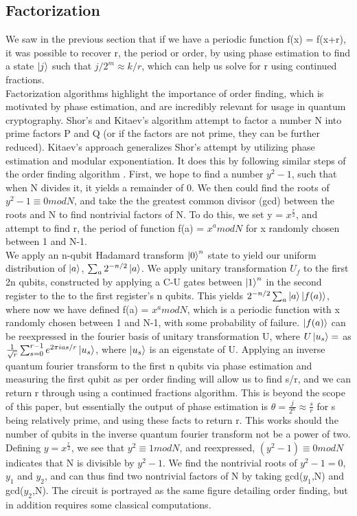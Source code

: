 \documentclass[11pt]{journal}
\begin{document}
\subsection{Factorization}
We saw in the previous section that if we have a periodic function f(x) = f(x+r), it was possible to recover r, the period or order, by using phase estimation to find a state $\ket{j}$ such that $j/2^m \approx k/r$, which can help us solve for r using continued fractions. 
\\\indent Factorization algorithms highlight the importance of order finding, which is motivated by phase estimation, and are incredibly relevant for usage in quantum cryptography. Shor’s and Kitaev's algorithm attempt to factor a number N into prime factors P and Q (or if the factors are not prime, they can be further reduced). Kitaev's approach generalizes Shor's attempt by utilizing phase estimation and modular exponentiation. It does this by following similar steps of the order finding algorithm \cite{factor}. First, we hope to find a number $y^2 - 1$, such that when N divides it, it yields a remainder of 0. We then could find the roots of $y^2 - 1\equiv 0 mod N$, and take the the greatest common divisor (gcd) between the roots and N to find nontrivial factors of N. To do this, we set y = $x^\frac{r}{2}$, and attempt to find r, the period of function f(a) = $x^a mod N$ for x randomly chosen between 1 and N-1.
\\\indent We apply an n-qubit Hadamard transform $\ket{0}^n$ state to yield our uniform distribution of $\ket{a}$, $\sum_a 2^{-n/2} \ket{a}$. We apply unitary transformation $U_f$ to the first 2n qubits, constructed by applying a C-U gates between $\ket{1}^n$ in the second register to the  to the first register's n qubits. This yields $2^{-n/2} \sum_a \ket{a}\ket{f(a)}$, where now we have defined f(a) = $x^a mod N$, which is a periodic function with x randomly chosen between 1 and N-1, with some probability of failure. $\ket{f(a)}$ can be reexpressed in the fourier basis of unitary transformation U, where $U\ket{u_s} = $ as $\frac{1}{\sqrt{r}} \sum_{s=0}^{r-1} e^{2\pi i as/r} \ket{u_s}$, where $\ket{u_s}$ is an eigenstate of U. Applying an inverse quantum fourier transform to the first n qubits via phase estimation and measuring the first qubit as per order finding will allow us to find s/r, and we can return r through using a continued fractions algorithm. This is beyond the scope of this paper, but essentially the output of phase estimation is $\theta = \frac{j}{2^n} \approx \frac{s}{r}$ for s being relatively prime, and using these facts to return r. This works should the number of qubits in the inverse quantum fourier transform not be a power of two. Defining $y = x^{\frac{r}{2}}$, we see that $y^2 \equiv 1 mod N$, and reexpressed, $(y^2 - 1) \equiv 0 mod N$  indicates that N is divisible by $y^2-1$. We find the nontrivial roots of $y^2 - 1 = 0$, $y_1$ and $y_2$, and can thus find two nontrivial factors of N by taking gcd($y_1$,N) and gcd($y_2$,N). The circuit is portrayed as the same figure detailing order finding, but in addition requires some classical computations\cite{vaz}.
\end{document}
